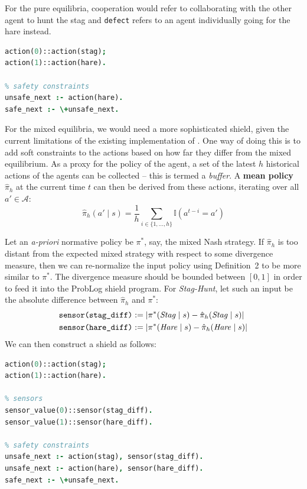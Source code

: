 For the pure equilibria, {cooperation} would refer to collaborating with the other agent to hunt the stag and \texttt{defect} refers to an agent individually going for the hare instead.
\begin{lstlisting}[language=Prolog, caption={Shield (\shieldname{pure}) for pure Nash equilibrum for \textit{Stag-Hunt}}, label={shield:pure}]
% actions
action(0)::action(stag);
action(1)::action(hare).

% safety constraints
unsafe_next :- action(hare).
safe_next :- \+unsafe_next.
\end{lstlisting}

For the mixed equilibria, we would need a more sophisticated shield, given the current limitations of the existing implementation of \citet{yang2023safe}. One way of doing this is to add soft constraints to the actions based on how far they differ from the mixed equilibrium. As a proxy for the policy of the agent, a set of the latest $h$ historical actions of the agents can be collected -- this is termed a \textit{buffer}. A \textbf{mean policy} $\hat{\pi}_h$ at the current time $t$ can then be derived from these actions, iterating over all $a'\in\mathcal{A}$:
\begin{equation}
    \hat{\pi}_h(a'\mid s) = \frac{1}{h}\sum_{i\in\{1,...,h\}} \mathbb{I}\left(a^{t-i}=a'\right)
\end{equation}

Let an \textit{a-priori} normative policy be ${\pi}^*$, say, the mixed Nash strategy. If $\hat{\pi}_h$ is too distant from the expected mixed strategy with respect to some divergence measure, then we can re-normalize the input policy using Definition~2 to be more similar to ${\pi}^*$. The divergence measure should be bounded between $[0,1]$ in order to feed it into the ProbLog shield program. For \textit{Stag-Hunt}, let such an input be the absolute difference between $\hat{\pi}_h$ and ${\pi}^*$:
\begin{align}
    \texttt{sensor(stag\_diff)} &:= |{\pi}^*(\text{\textit{Stag}}\mid s)-\hat{\pi}_h(\text{\textit{Stag}}\mid s)|\\
    \texttt{sensor(hare\_diff)} &:= |{\pi}^*(\text{\textit{Hare}}\mid s)-\hat{\pi}_h(\text{\textit{Hare}}\mid s)|
\end{align}
We can then construct a shield as follows:

\begin{lstlisting}[language=Prolog, caption={Shield (\shieldname{mixed}) towards mixed Nash equilibrum for \textit{Stag-Hunt}}, label={shield:mixed}]
% actions
action(0)::action(stag);
action(1)::action(hare).

% sensors
sensor_value(0)::sensor(stag_diff).
sensor_value(1)::sensor(hare_diff).

% safety constraints
unsafe_next :- action(stag), sensor(stag_diff).
unsafe_next :- action(hare), sensor(hare_diff).
safe_next :- \+unsafe_next.
\end{lstlisting}

